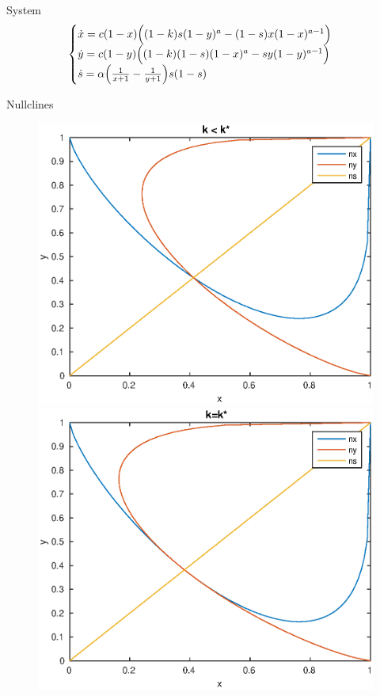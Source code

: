 \documentclass[10pt]{beamer}
\begin{document}
\begin{frame}{System}
\begin{equation}
\label{eq:2d}
\begin{cases}
\dot{x} = c(1-x) \Big( (1-k)s(1-y)^a - (1-s)x(1-x)^{a-1} \Big) \\
\dot{y} = c(1-y) \Big( (1-k)(1-s)(1-x)^a - sy(1-y)^{a-1} \Big) \\
\dot{s} = \alpha \Big( \frac{1}{x+1} - \frac{1}{y+1}\Big) s (1-s) \\
\end{cases}
\end{equation}

\begin{exampleblock}{Nullclines}
\begin{figure}[H]
\centering
\includegraphics[scale=0.2]{nullpp.eps}
\includegraphics[scale=0.2]{nulle.eps}

\end{figure}
\end{exampleblock}
\end{frame}
\end{document}
